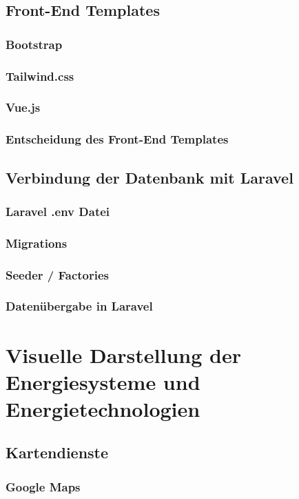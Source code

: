 \subsection{Front-End Templates}
\subsubsection{Bootstrap}
\subsubsection{Tailwind.css}
\subsubsection{Vue.js}
\subsubsection{Entscheidung des Front-End Templates}


\subsection{Verbindung der Datenbank mit Laravel}
\subsubsection{Laravel .env Datei }
\subsubsection{Migrations}
\subsubsection{Seeder / Factories}
\subsubsection{Datenübergabe in Laravel}


\section {Visuelle Darstellung der Energiesysteme und Energietechnologien }

\subsection{Kartendienste}

\subsubsection{Google Maps}
